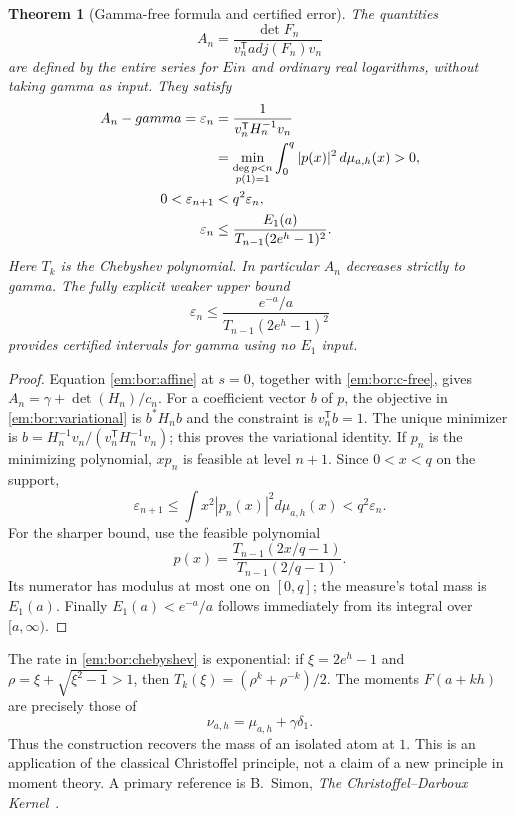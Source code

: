 \documentclass[11pt,a4paper]{article}
\newtheorem{theorem}{Theorem}[section]
\theoremstyle{definition}
\theoremstyle{remark}
\theoremstyle{plain}
\numberwithin{equation}{section}
\def\operatorname#1{#1}\def\mathrm#1{#1}}
\begin{document}
\begin{theorem}[Gamma-free formula and certified error]
\label{em:bor:christoffel}
The quantities
\[
 A_n=\frac{\det F_n}{v_n^{\mathsf T}\operatorname{adj}(F_n)v_n}
\]
are defined by the entire series for $\operatorname{Ein}$ and ordinary
real logarithms, without taking gamma as input.  They satisfy
\begin{align}
 A_n-\gamma=\varepsilon_n
 &=\frac{1}{v_n^{\mathsf T}H_n^{-1}v_n}\notag\\
 &=\min_{\substack{\deg p<n\\p(1)=1}}
      \int_0^q|p(x)|^2\,d\mu_{a,h}(x)>0,\label{em:bor:variational}\\
 0<\varepsilon_{n+1}&<q^2\varepsilon_n,\label{em:bor:contraction}\\
 \varepsilon_n&\le
 \frac{E_1(a)}{T_{n-1}(2e^h-1)^2}.
 \label{em:bor:chebyshev}
\end{align}
Here $T_k$ is the Chebyshev polynomial.  In particular $A_n$ decreases
strictly to gamma.  The fully explicit weaker upper bound
\[
 \varepsilon_n\le
 \frac{e^{-a}/a}{T_{n-1}(2e^h-1)^2}
\]
provides certified intervals for gamma using no $E_1$ input.
\end{theorem}
\begin{proof}
Equation \eqref{em:bor:affine} at $s=0$, together with
\eqref{em:bor:c-free}, gives $A_n=\gamma+\det(H_n)/c_n$.
For a coefficient vector $b$ of $p$, the objective in
\eqref{em:bor:variational} is $b^*H_nb$ and the constraint is
$v_n^{\mathsf T}b=1$.  The unique minimizer is
$b=H_n^{-1}v_n/(v_n^{\mathsf T}H_n^{-1}v_n)$; this proves the
variational identity.  If $p_n$ is the minimizing polynomial, $xp_n$
is feasible at level $n+1$.  Since $0<x<q$ on the support,
\[
 \varepsilon_{n+1}\le\int x^2|p_n(x)|^2d\mu_{a,h}(x)
       <q^2\varepsilon_n.
\]
For the sharper bound, use the feasible polynomial
\[
 p(x)=\frac{T_{n-1}(2x/q-1)}{T_{n-1}(2/q-1)}.
\]
Its numerator has modulus at most one on $[0,q]$; the measure's total
mass is $E_1(a)$.  Finally $E_1(a)<e^{-a}/a$ follows immediately
from its integral over $[a,\infty)$.
\end{proof}

The rate in \eqref{em:bor:chebyshev} is exponential: if
$\xi=2e^h-1$ and $\rho=\xi+\sqrt{\xi^2-1}>1$, then
$T_k(\xi)=(\rho^k+\rho^{-k})/2$.
The moments $F(a+kh)$ are precisely those of
\[
 \nu_{a,h}=\mu_{a,h}+\gamma\delta_1.
\]
Thus the construction recovers the mass of an isolated atom at $1$.
This is an application of the classical Christoffel principle, not a
claim of a new principle in moment theory.  A primary reference is
B.~Simon, \emph{The Christoffel--Darboux Kernel}~\cite{Simon}.
\end{document}
